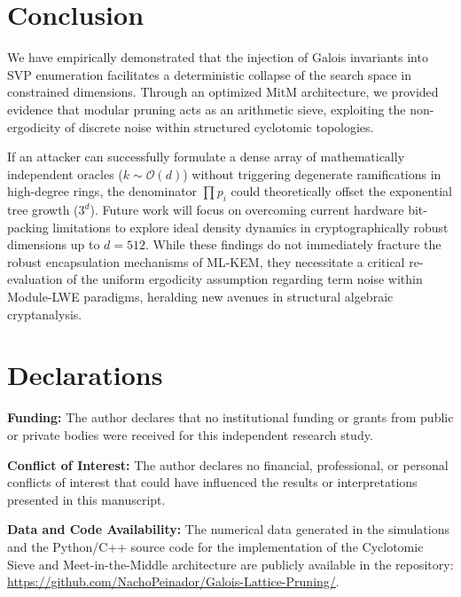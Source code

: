 \documentclass[sn-mathphys, a4paper]{sn-jnl}
\begin{document}
\section{Conclusion}

We have empirically demonstrated that the injection of Galois invariants into SVP enumeration facilitates a deterministic collapse of the search space in constrained dimensions. Through an optimized MitM architecture, we provided evidence that modular pruning acts as an arithmetic sieve, exploiting the non-ergodicity of discrete noise within structured cyclotomic topologies.

If an attacker can successfully formulate a dense array of mathematically independent oracles ($k \sim \mathcal{O}(d)$) without triggering degenerate ramifications in high-degree rings, the denominator $\prod p_i$ could theoretically offset the exponential tree growth ($3^d$). Future work will focus on overcoming current hardware bit-packing limitations to explore ideal density dynamics in cryptographically robust dimensions up to $d=512$. While these findings do not immediately fracture the robust encapsulation mechanisms of ML-KEM, they necessitate a critical re-evaluation of the uniform ergodicity assumption regarding term noise within Module-LWE paradigms, heralding new avenues in structural algebraic cryptanalysis.

\section*{Declarations}

\textbf{Funding:} The author declares that no institutional funding or grants from public or private bodies were received for this independent research study.

\textbf{Conflict of Interest:} The author declares no financial, professional, or personal conflicts of interest that could have influenced the results or interpretations presented in this manuscript.

\textbf{Data and Code Availability:} The numerical data generated in the simulations and the Python/C++ source code for the implementation of the Cyclotomic Sieve and Meet-in-the-Middle architecture are publicly available in the repository: \url{https://github.com/NachoPeinador/Galois-Lattice-Pruning/}.
\end{document}
